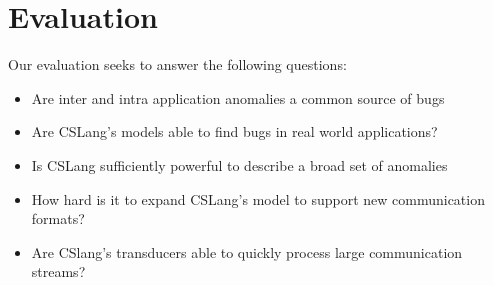 \section{Evaluation}
\label{SEC:evaluation}

Our evaluation seeks to answer the following questions:

\begin{itemize}

  \item{Are inter and intra application anomalies a common source of
    bugs}

  \item{Are CSLang's models able to find bugs in real world applications?}

  \item{Is CSLang sufficiently powerful to describe a broad set of
    anomalies}

  \item{How hard is it to expand CSLang's model to support new
    communication formats?}

  \item{Are CSlang's transducers able to quickly process large
    communication streams?}

\end{itemize}
